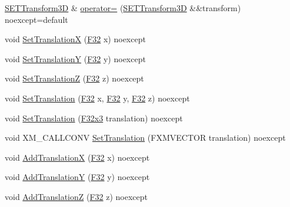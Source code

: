 \begin{DoxyCompactItemize}
\item 
\mbox{\hyperlink{classmage_1_1_s_e_t_transform3_d}{S\+E\+T\+Transform3D}} \& \mbox{\hyperlink{classmage_1_1_s_e_t_transform3_d_a75a49a24851f1d87898edf46313a2e0e}{operator=}} (\mbox{\hyperlink{classmage_1_1_s_e_t_transform3_d}{S\+E\+T\+Transform3D}} \&\&transform) noexcept=default
\item 
void \mbox{\hyperlink{classmage_1_1_s_e_t_transform3_d_a3df06b3195b19d99921e75c67d12b867}{Set\+TranslationX}} (\mbox{\hyperlink{namespacemage_aa97e833b45f06d60a0a9c4fc22ae02c0}{F32}} x) noexcept
\item 
void \mbox{\hyperlink{classmage_1_1_s_e_t_transform3_d_a8e7971f905661f95e3bf1780129eee93}{Set\+TranslationY}} (\mbox{\hyperlink{namespacemage_aa97e833b45f06d60a0a9c4fc22ae02c0}{F32}} y) noexcept
\item 
void \mbox{\hyperlink{classmage_1_1_s_e_t_transform3_d_a094d825a2722f41d38ca8e54dcea59ec}{Set\+TranslationZ}} (\mbox{\hyperlink{namespacemage_aa97e833b45f06d60a0a9c4fc22ae02c0}{F32}} z) noexcept
\item 
void \mbox{\hyperlink{classmage_1_1_s_e_t_transform3_d_a68feaf4412b6218de01c9beb79e0a000}{Set\+Translation}} (\mbox{\hyperlink{namespacemage_aa97e833b45f06d60a0a9c4fc22ae02c0}{F32}} x, \mbox{\hyperlink{namespacemage_aa97e833b45f06d60a0a9c4fc22ae02c0}{F32}} y, \mbox{\hyperlink{namespacemage_aa97e833b45f06d60a0a9c4fc22ae02c0}{F32}} z) noexcept
\item 
void \mbox{\hyperlink{classmage_1_1_s_e_t_transform3_d_add9867969ff905c6b58a6069139dc1ca}{Set\+Translation}} (\mbox{\hyperlink{namespacemage_a1e3c7a882af461f161caa1cbddaf1fa2}{F32x3}} translation) noexcept
\item 
void X\+M\+\_\+\+C\+A\+L\+L\+C\+O\+NV \mbox{\hyperlink{classmage_1_1_s_e_t_transform3_d_a525f7b5983a4d29071e3032e06dce980}{Set\+Translation}} (F\+X\+M\+V\+E\+C\+T\+OR translation) noexcept
\item 
void \mbox{\hyperlink{classmage_1_1_s_e_t_transform3_d_af1ac42f0c05a13df88ee971fc198ac5a}{Add\+TranslationX}} (\mbox{\hyperlink{namespacemage_aa97e833b45f06d60a0a9c4fc22ae02c0}{F32}} x) noexcept
\item 
void \mbox{\hyperlink{classmage_1_1_s_e_t_transform3_d_aaa515b56bff18d9d10ac79f72e5dcb4f}{Add\+TranslationY}} (\mbox{\hyperlink{namespacemage_aa97e833b45f06d60a0a9c4fc22ae02c0}{F32}} y) noexcept
\item 
void \mbox{\hyperlink{classmage_1_1_s_e_t_transform3_d_a2c9163b92e80ef99eb96dff121bdb1a0}{Add\+TranslationZ}} (\mbox{\hyperlink{namespacemage_aa97e833b45f06d60a0a9c4fc22ae02c0}{F32}} z) noexcept

\end{DoxyCompactItemize}
